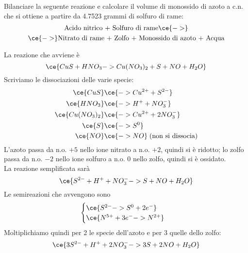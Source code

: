 \begin{esercizio}
    Bilanciare la seguente reazione e calcolare il volume di monossido di azoto a c.n. che si ottiene a partire da 4.7523 grammi di solfuro di rame:
    \begin{gather*}
        \text{Acido nitrico + Solfuro di rame} \ce{->}
        \\
        \ce{->} \text{Nitrato di rame + Zolfo + Monossido di azoto + Acqua}
    \end{gather*}
\end{esercizio}
\begin{soluzione}
    La reazione che avviene è
    \begin{equation*}
        \ce{CuS + HNO_3 -> Cu(NO_3)_2 + S + NO + H_2O }
    \end{equation*}
    Scriviamo le dissociazioni delle varie specie:
    \begin{equation*}
        \begin{split}
            \ce{CuS} & \ce{-> Cu^{2+} + S^{2-}}
            \\
            \ce{HNO_3} & \ce{-> H^+ + NO_3^-}
            \\
            \ce{Cu(NO_3)_2} & \ce{-> Cu^{2+} + 2NO_3^-}
            \\
            \ce{S} & \ce{-> S^0}
            \\
            \ce{NO} & \ce{-> NO} \; \text{(non si dissocia)}
        \end{split}
    \end{equation*}
    L'azoto passa da n.o. $+5$ nello ione nitrato a n.o. $+2$, quindi si è ridotto; lo zolfo passa da n.o. $-2$ nello ione solfuro a n.o. $0$ nello zolfo, quindi si è ossidato.\\
    La reazione semplificata sarà
    \begin{equation*}
        \ce{S^{2-} + H^+ + NO_3^- -> S + NO + H_2O}
    \end{equation*}
    Le semireazioni che avvengono sono
    \begin{equation*}
        \begin{cases}
            \ce{S^{2-} -> S^0 + 2e^-}\\
            \ce{N^{5+} + 3e^- -> N^{2+}}
        \end{cases}
    \end{equation*}
    Moltiplichiamo quindi per 2 le specie dell'azoto e per 3 quelle dello zolfo:
    \begin{equation*}
        \ce{3S^{2-} + H^+ + 2NO_3^- -> 3S + 2NO + H_2O}

\end{equation*}
\end{soluzione}
